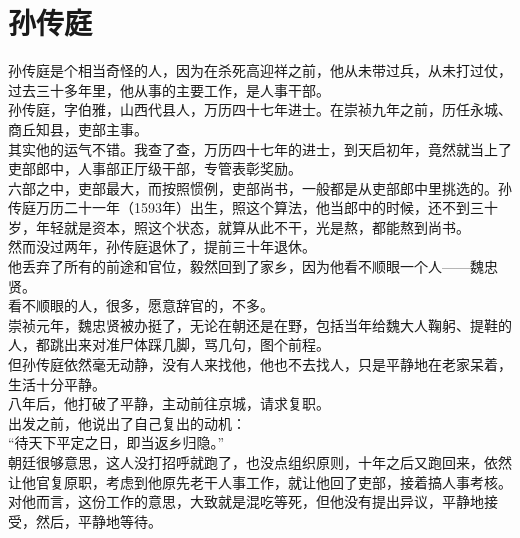 \section{孙传庭}
\ifnum{}
	\begin{multicols}{\theparacolNo}
\fi
孙传庭是个相当奇怪的人，因为在杀死高迎祥之前，他从未带过兵，从未打过仗，过去三十多年里，他从事的主要工作，是人事干部。\\

孙传庭，字伯雅，山西代县人，万历四十七年进士。在崇祯九年之前，历任永城、商丘知县，吏部主事。\\

其实他的运气不错。我查了查，万历四十七年的进士，到天启初年，竟然就当上了吏部郎中，人事部正厅级干部，专管表彰奖励。\\

六部之中，吏部最大，而按照惯例，吏部尚书，一般都是从吏部郎中里挑选的。孙传庭万历二十一年（1593年）出生，照这个算法，他当郎中的时候，还不到三十岁，年轻就是资本，照这个状态，就算从此不干，光是熬，都能熬到尚书。\\

然而没过两年，孙传庭退休了，提前三十年退休。\\

他丢弃了所有的前途和官位，毅然回到了家乡，因为他看不顺眼一个人——魏忠贤。\\

看不顺眼的人，很多，愿意辞官的，不多。\\

崇祯元年，魏忠贤被办挺了，无论在朝还是在野，包括当年给魏大人鞠躬、提鞋的人，都跳出来对准尸体踩几脚，骂几句，图个前程。\\

但孙传庭依然毫无动静，没有人来找他，他也不去找人，只是平静地在老家呆着，生活十分平静。\\

八年后，他打破了平静，主动前往京城，请求复职。\\

出发之前，他说出了自己复出的动机：\\

“待天下平定之日，即当返乡归隐。”\\

朝廷很够意思，这人没打招呼就跑了，也没点组织原则，十年之后又跑回来，依然让他官复原职，考虑到他原先老干人事工作，就让他回了吏部，接着搞人事考核。\\

对他而言，这份工作的意思，大致就是混吃等死，但他没有提出异议，平静地接受，然后，平静地等待。\\


\end{multicols}
